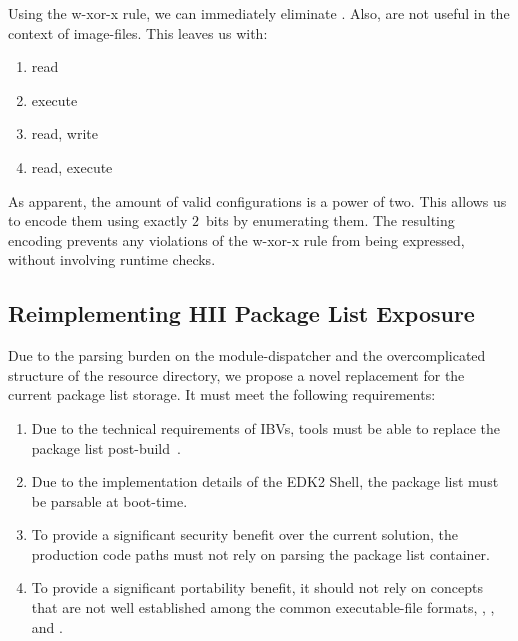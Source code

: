 \begin{absolutelynopagebreak}
Using the \gls{w-xor-x} rule, we can immediately eliminate . Also,  are not useful in the context of \glspl{image-file}. This leaves us with:
\begin{multicols}{2}
  \begin{enumerate}
    \item read
    \item execute
    \item read, write
    \item read, execute
  \end{enumerate}
\end{multicols}
\end{absolutelynopagebreak}

As apparent, the amount of valid configurations is a power of two. This allows us to encode them using exactly $2$~bits by enumerating them. The resulting encoding prevents any violations of the \gls{w-xor-x} rule from being expressed, without involving runtime checks.

\subsection{Reimplementing HII Package List Exposure}

Due to the parsing burden on the \gls{module-dispatcher} and the overcomplicated structure of the  resource directory, we propose a novel replacement for the current  package list storage. It must meet the following requirements:
\begin{enumerate}
  \item Due to the technical requirements of \glspl{IBV}, tools must be able to replace the  package list post-build~\cite{hii-mail}.
  \item Due to the implementation details of the \gls{EDK2} Shell, the  package list must be parsable at boot-time.
  \item To provide a significant security benefit over the current solution, the production code paths must not rely on parsing the  package list container.
  \item To provide a significant portability benefit, it should not rely on concepts that are not well established among the common \gls{executable-file} formats, , , and .
\end{enumerate}

